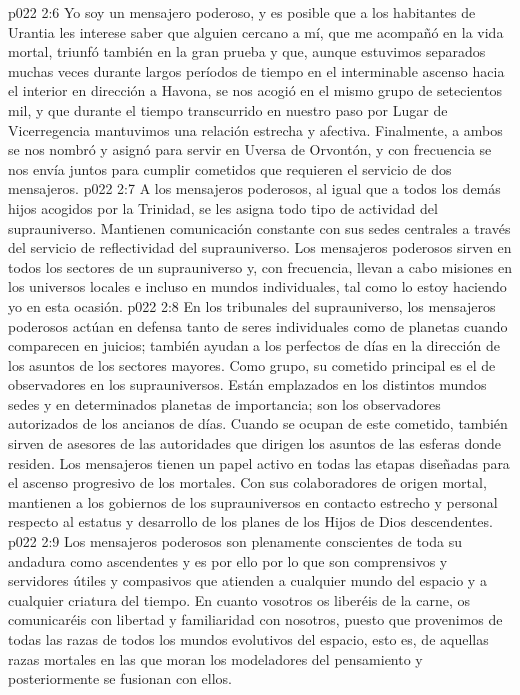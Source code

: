\vs p022 2:6 \pc Yo soy un mensajero poderoso, y es posible que a los habitantes de Urantia les interese saber que alguien cercano a mí, que me acompañó en la vida mortal, triunfó también en la gran prueba y que, aunque estuvimos separados muchas veces durante largos períodos de tiempo en el interminable ascenso hacia el interior en dirección a Havona, se nos acogió en el mismo grupo de setecientos mil, y que durante el tiempo transcurrido en nuestro paso por Lugar de Vicerregencia mantuvimos una relación estrecha y afectiva. Finalmente, a ambos se nos nombró y asignó para servir en Uversa de Orvontón, y con frecuencia se nos envía juntos para cumplir cometidos que requieren el servicio de dos mensajeros.
\vs p022 2:7 \pc A los mensajeros poderosos, al igual que a todos los demás hijos acogidos por la Trinidad, se les asigna todo tipo de actividad del suprauniverso. Mantienen comunicación constante con sus sedes centrales a través del servicio de reflectividad del suprauniverso. Los mensajeros poderosos sirven en todos los sectores de un suprauniverso y, con frecuencia, llevan a cabo misiones en los universos locales e incluso en mundos individuales, tal como lo estoy haciendo yo en esta ocasión.
\vs p022 2:8 En los tribunales del suprauniverso, los mensajeros poderosos actúan en defensa tanto de seres individuales como de planetas cuando comparecen en juicios; también ayudan a los perfectos de días en la dirección de los asuntos de los sectores mayores. Como grupo, su cometido principal es el de observadores en los suprauniversos. Están emplazados en los distintos mundos sedes y en determinados planetas de importancia; son los observadores autorizados de los ancianos de días. Cuando se ocupan de este cometido, también sirven de asesores de las autoridades que dirigen los asuntos de las esferas donde residen. Los mensajeros tienen un papel activo en todas las etapas diseñadas para el ascenso progresivo de los mortales. Con sus colaboradores de origen mortal, mantienen a los gobiernos de los suprauniversos en contacto estrecho y personal respecto al estatus y desarrollo de los planes de los Hijos de Dios descendentes.
\vs p022 2:9 Los mensajeros poderosos son plenamente conscientes de toda su andadura como ascendentes y es por ello por lo que son comprensivos y servidores útiles y compasivos que atienden a cualquier mundo del espacio y a cualquier criatura del tiempo. En cuanto vosotros os liberéis de la carne, os comunicaréis con libertad y familiaridad con nosotros, puesto que provenimos de todas las razas de todos los mundos evolutivos del espacio, esto es, de aquellas razas mortales en las que moran los modeladores del pensamiento y posteriormente se fusionan con ellos.

